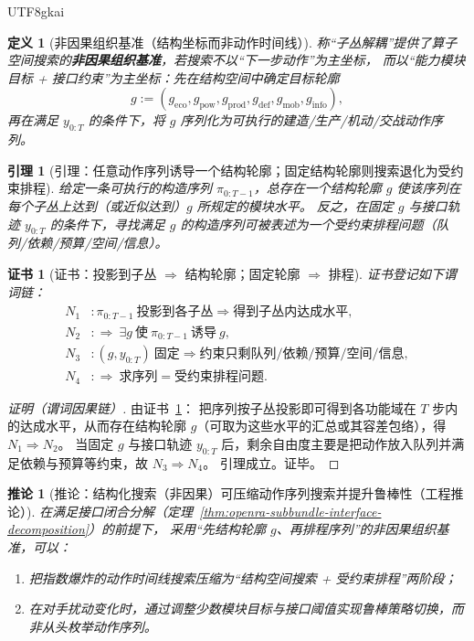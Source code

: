 \documentclass[12pt]{article}
\newtheorem{definition}{定义}[section]
\newtheorem{corollary}{推论}[section]
\newtheorem{lemma}{引理}[section]
\newtheorem{Certificate}{证书}[section]
\begin{document}
\begin{CJK*}{UTF8}{gkai}
\begin{definition}[非因果组织基准（结构坐标而非动作时间线）]
称“子丛解耦”提供了算子空间搜索的\textbf{非因果组织基准}，若搜索不以“下一步动作”为主坐标，
而以“能力模块目标 + 接口约束”为主坐标：先在结构空间中确定目标轮廓
\[
  g := (g_{\mathrm{eco}},g_{\mathrm{pow}},g_{\mathrm{prod}},g_{\mathrm{def}},g_{\mathrm{mob}},g_{\mathrm{info}}),
\]
再在满足 $y_{0:T}$ 的条件下，将 $g$ 序列化为可执行的建造/生产/机动/交战动作序列。
\end{definition}

\begin{lemma}[引理：任意动作序列诱导一个结构轮廓；固定结构轮廓则搜索退化为受约束排程]
\label{lem:openra-structure-profile-and-scheduling}
给定一条可执行的构造序列 $\pi_{0:T-1}$，总存在一个结构轮廓 $g$ 使该序列在每个子丛上达到（或近似达到）$g$ 所规定的模块水平。
反之，在固定 $g$ 与接口轨迹 $y_{0:T}$ 的条件下，寻找满足 $g$ 的构造序列可被表述为一个受约束排程问题（队列/依赖/预算/空间/信息）。
\end{lemma}

\begin{Certificate}[证书：投影到子丛 $\Rightarrow$ 结构轮廓；固定轮廓 $\Rightarrow$ 排程]
\label{cert:openra-structure-profile-and-scheduling}
证书登记如下谓词链：
\[
\begin{aligned}
  N_1 &: \pi_{0:T-1}\ \text{投影到各子丛}\Rightarrow \text{得到子丛内达成水平},\\
  N_2 &: \Rightarrow\ \exists g\ \text{使}\ \pi_{0:T-1}\ \text{诱导}\ g,\\
  N_3 &: (g,y_{0:T})\ \text{固定}\Rightarrow \text{约束只剩队列/依赖/预算/空间/信息},\\
  N_4 &: \Rightarrow\ \text{求序列}=\text{受约束排程问题}.
\end{aligned}
\]
\end{Certificate}

\begin{proof}[证明（谓词因果链）]
由证书~\ref{cert:openra-structure-profile-and-scheduling}：
把序列按子丛投影即可得到各功能域在 $T$ 步内的达成水平，从而存在结构轮廓 $g$（可取为这些水平的汇总或其容差包络），得 $N_1\Rightarrow N_2$。
当固定 $g$ 与接口轨迹 $y_{0:T}$ 后，剩余自由度主要是把动作放入队列并满足依赖与预算等约束，故 $N_3\Rightarrow N_4$。
引理成立。证毕。
\end{proof}

\begin{corollary}[推论：结构化搜索（非因果）可压缩动作序列搜索并提升鲁棒性（工程推论）]
\label{cor:openra-noncausal-search-advantage}
在满足接口闭合分解（定理~\ref{thm:openra-subbundle-interface-decomposition}）的前提下，
采用“先结构轮廓 $g$、再排程序列”的非因果组织基准，可以：
\begin{enumerate}
  \item 把指数爆炸的动作时间线搜索压缩为“结构空间搜索 + 受约束排程”两阶段；
  \item 在对手扰动变化时，通过调整少数模块目标与接口阈值实现鲁棒策略切换，而非从头枚举动作序列。
\end{enumerate}
\end{corollary}


\end{CJK*}
\end{document}
